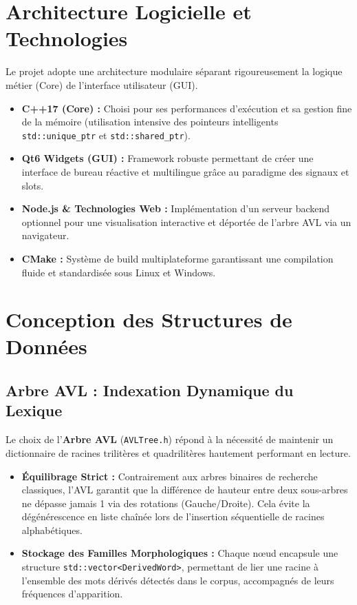 \documentclass[12pt,a4paper]{article}
\begin{document}
\section{Architecture Logicielle et Technologies}
Le projet adopte une architecture modulaire séparant rigoureusement la logique métier (Core) de l'interface utilisateur (GUI).
\begin{itemize}[label=\textbullet, itemsep=2pt]
	\item \textbf{C++17 (Core) :} Choisi pour ses performances d'exécution et sa gestion fine de la mémoire (utilisation intensive des pointeurs intelligents \texttt{std::unique\_ptr} et \texttt{std::shared\_ptr}).
	\item \textbf{Qt6 Widgets (GUI) :} Framework robuste permettant de créer une interface de bureau réactive et multilingue grâce au paradigme des signaux et slots.
	\item \textbf{Node.js \& Technologies Web :} Implémentation d'un serveur backend optionnel pour une visualisation interactive et déportée de l'arbre AVL via un navigateur.
	\item \textbf{CMake :} Système de build multiplateforme garantissant une compilation fluide et standardisée sous Linux et Windows.
\end{itemize}

\section{Conception des Structures de Données}

\subsection{Arbre AVL : Indexation Dynamique du Lexique}
Le choix de l'\textbf{Arbre AVL} (\texttt{AVLTree.h}) répond à la nécessité de maintenir un dictionnaire de racines trilitères et quadrilitères hautement performant en lecture.
\begin{itemize}[label=\textbullet, itemsep=2pt]
	\item \textbf{Équilibrage Strict :} Contrairement aux arbres binaires de recherche classiques, l'AVL garantit que la différence de hauteur entre deux sous-arbres ne dépasse jamais 1 via des rotations (Gauche/Droite). Cela évite la dégénérescence en liste chaînée lors de l'insertion séquentielle de racines alphabétiques.
	\item \textbf{Stockage des Familles Morphologiques :} Chaque nœud encapsule une structure \texttt{std::vector<DerivedWord>}, permettant de lier une racine à l'ensemble des mots dérivés détectés dans le corpus, accompagnés de leurs fréquences d'apparition.
\end{itemize}
\end{document}
